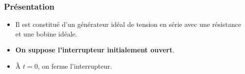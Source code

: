 \documentclass[../../main/main.tex]{subfiles}
\begin{document}
\subsubsection{Présentation}
\noindent
\begin{minipage}[c]{.6\linewidth}
	\begin{itemize}
		\item Il est constitué d'un générateur idéal de tension en série avec une
		      résistance et une bobine idéale.
		\item \textbf{On suppose l'interrupteur initialement ouvert}.
		\item À $t=0$, on ferme l'interrupteur.
	\end{itemize}
\end{minipage}
\hfill
\begin{minipage}[c]{.35\linewidth}
	~
	\begin{center}
		\label{fig:circ_rl-start}
	\end{center}
\end{minipage}
\end{document}
